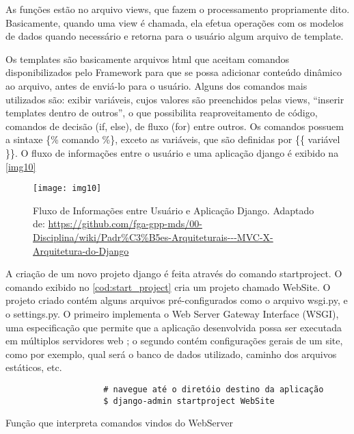 				As funções estão no arquivo views, que fazem o processamento propriamente dito. Basicamente, quando uma view é chamada, ela efetua operações com os modelos de dados quando necessário e retorna para o usuário algum arquivo de template.
				
				Os templates são basicamente arquivos html que aceitam comandos disponibilizados pelo Framework para que se possa adicionar conteúdo dinâmico ao arquivo, antes de enviá-lo para o usuário. Alguns dos comandos mais utilizados são: exibir variáveis, cujos valores são preenchidos pelas views, ``inserir templates dentro de outros'', o que possibilita reaproveitamento de código, comandos de decisão (if, else), de fluxo (for) entre outros. Os comandos possuem a sintaxe  \{\% comando \%\}, exceto as variáveis, que são definidas por \{\{ variável \}\}. O fluxo de informações entre o usuário e uma aplicação django é exibido na \autoref{img10}
				
				\begin{figure}[!htb]	
					\captionsetup{justification=centering}
					\begin{center}
						\texttt{[image: img10]}  %
						\caption[Fluxo de Informações entre Usuário e Aplicação Django]{\label{img10}Fluxo de Informações entre Usuário e Aplicação Django. Adaptado de: \url{https://github.com/fga-gpp-mds/00-Disciplina/wiki/Padr\%C3\%B5es-Arquiteturais---MVC-X-Arquitetura-do-Django}}
					\end{center}		
				\end{figure}
				
				A criação de um novo projeto django é feita através do comando startproject. O comando exibido no \autoref{cod:start_project} cria um projeto chamado WebSite. O projeto criado contém alguns arquivos pré-configurados como o arquivo wsgi.py, e o settings.py. O primeiro implementa o Web Server Gateway Interface (WSGI), uma especificação que permite que a aplicação desenvolvida possa ser executada em múltiplos servidores web \cite{klaus2012}; o segundo contém configurações gerais de um site, como por exemplo, qual será o banco de dados utilizado, caminho dos arquivos estáticos, etc.
								
				\begin{listing}[!htb]
					\begin{verbatim}
					# navegue até o diretóio destino da aplicação
					$ django-admin startproject WebSite
					\end{verbatim}
					\caption{Função que interpreta comandos vindos do WebServer}
					\label{cod:start_project}
				\end{listing}
			

